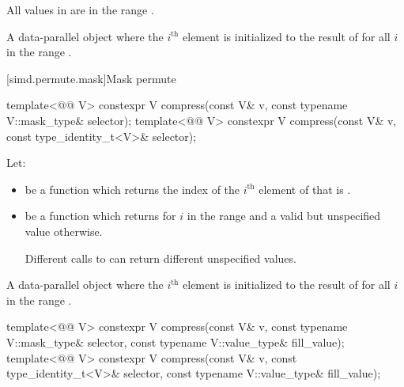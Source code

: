 \begin{itemdescr}
\pnum
\expects
All values in  are in the range .

\pnum
\returns
A data-parallel object where the $i^\text{th}$
element is initialized to the result of  for all $i$ in
the range .
\end{itemdescr}

[simd.permute.mask]{Mask permute}

\begin{itemdecl}
template<@@ V>
  constexpr V compress(const V& v, const typename V::mask_type& selector);
template<@@ V>
  constexpr V compress(const V& v, const type_identity_t<V>& selector);
\end{itemdecl}

\begin{itemdescr}
\pnum
Let:
\begin{itemize}
\item
{} be a function which returns the index
of the $i^\text{th}$ element of  that is .
\item
{} be a function which returns
 for $i$ in the range
 and a valid but unspecified value
otherwise.
\begin{note}
Different calls to  can return different unspecified values.
\end{note}
\end{itemize}

\pnum
\returns
A data-parallel object where the $i^\text{th}$
element is initialized to the result of 
for all $i$ in the range .
\end{itemdescr}

\begin{itemdecl}
template<@@ V>
  constexpr V compress(const V& v, const typename V::mask_type& selector,
                       const typename V::value_type& fill_value);
template<@@ V>
  constexpr V compress(const V& v, const type_identity_t<V>& selector,
                       const typename V::value_type& fill_value);
\end{itemdecl}

